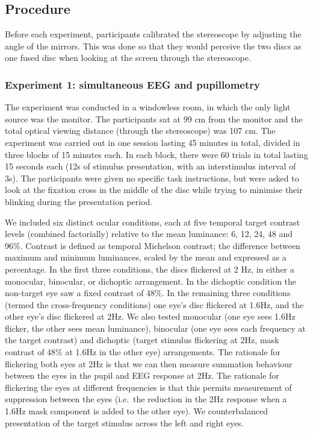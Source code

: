 \documentclass[
]{article}
\begin{document}
\hypertarget{procedure}{%
\subsection{Procedure}\label{procedure}}

Before each experiment, participants calibrated the stereoscope by adjusting the angle of the mirrors. This was done so that they would perceive the two discs as one fused disc when looking at the screen through the stereoscope.

\hypertarget{experiment-1-simultaneous-eeg-and-pupillometry}{%
\subsubsection{Experiment 1: simultaneous EEG and pupillometry}\label{experiment-1-simultaneous-eeg-and-pupillometry}}

The experiment was conducted in a windowless room, in which the only light source was the monitor. The participants sat at 99 cm from the monitor and the total optical viewing distance (through the stereoscope) was 107 cm. The experiment was carried out in one session lasting 45 minutes in total, divided in three blocks of 15 minutes each. In each block, there were 60 trials in total lasting 15 seconds each (12s of stimulus presentation, with an interstimulus interval of 3s). The participants were given no specific task instructions, but were asked to look at the fixation cross in the middle of the disc while trying to minimise their blinking during the presentation period.

We included six distinct ocular conditions, each at five temporal target contrast levels (combined factorially) relative to the mean luminance: 6, 12, 24, 48 and 96\%. Contrast is defined as temporal Michelson contrast; the difference between maximum and minimum luminances, scaled by the mean and expressed as a percentage. In the first three conditions, the discs flickered at 2 Hz, in either a monocular, binocular, or dichoptic arrangement. In the dichoptic condition the non-target eye saw a fixed contrast of 48\%. In the remaining three conditions (termed the cross-frequency conditions) one eye's disc flickered at 1.6Hz, and the other eye's disc flickered at 2Hz. We also tested monocular (one eye sees 1.6Hz flicker, the other sees mean luminance), binocular (one eye sees each frequency at the target contrast) and dichoptic (target stimulus flickering at 2Hz, mask contrast of 48\% at 1.6Hz in the other eye) arrangements. The rationale for flickering both eyes at 2Hz is that we can then measure summation behaviour between the eyes in the pupil and EEG response at 2Hz. The rationale for flickering the eyes at different frequencies is that this permits measurement of suppression between the eyes (i.e.~the reduction in the 2Hz response when a 1.6Hz mask component is added to the other eye). We counterbalanced presentation of the target stimulus across the left and right eyes.
\end{document}
